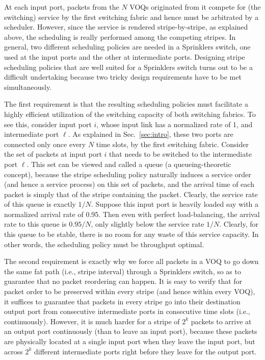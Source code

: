 At each input port, packets from the $N$ VOQs originated from it compete for (the switching) service by the first switching fabric
and hence must be arbitrated by a scheduler.   However, since the service is rendered stripe-by-stripe, as explained above, the scheduling
is really performed among the competing stripes.  In general, two different scheduling policies are needed in a Sprinklers switch, one used
at the input ports and the other at intermediate ports.  
Designing stripe scheduling policies that are well suited for a Sprinklers switch 
turns out to be a difficult undertaking because two tricky design requirements have to be met simultaneously.  

The first requirement is that the resulting scheduling policies must facilitate a highly efficient utilization of the switching capacity of both switching fabrics.
To see this, consider input port $i$, whose input link has a normalized rate of 1, and intermediate port $\ell$.  
As explained in 
Sec.~\ref{sec:intro}, these two ports are connected only once every $N$ time slots, by the first switching fabric.  
Consider the set of packets at input port $i$ that needs to be switched to the intermediate port $\ell$.  
This set can be viewed and called a queue (a queueing-theoretic concept), because 
the stripe scheduling policy naturally induces a service order (and hence a service process)
on this set of packets, and the arrival time of each packet is simply that of the stripe containing the packet.
Clearly, the service rate of this queue is exactly $1/N$.  Suppose this input port is heavily loaded 
say with a normalized arrival rate of 0.95.  Then even with perfect load-balancing, the arrival rate to this queue is $0.95/N$, only slightly below the service rate $1/N$.  
Clearly, for this queue to be stable,
there is no room for any waste of this service capacity.
In other words, the scheduling policy must be throughput optimal.

The second requirement is exactly why we force all packets in a VOQ to go down the same fat path (i.e., stripe interval) 
through a Sprinklers switch, so as to guarantee that no packet reordering
can happen.  
It is 
easy to verify
that for packet order to be preserved within every stripe (and hence within every VOQ),
it suffices to guarantee that packets in every stripe go into their destination output port from
consecutive intermediate ports in consecutive time slots (i.e., continuously).  However, it is much harder for a stripe of $2^k$ packets to arrive at an output port continuously (than to leave an input port),
because these packets are physically located at a single input port when they leave the input port, but 
across $2^k$ different intermediate
ports right before they leave for the output port.  

